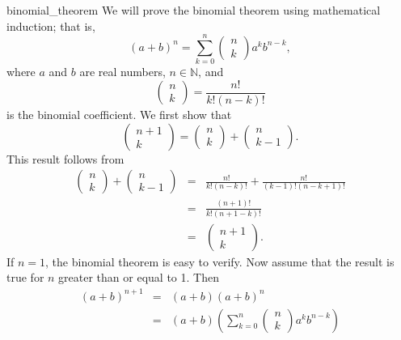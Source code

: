 \begin{example}{binomial_theorem}
We will prove the binomial theorem using mathematical induction; that is, 
$$
(a + b)^n = \sum_{k = 0}^{n} \left( \begin{array}{c} n \\ k \end{array} \right) a^k b^{n - k},
$$
where $a$ and $b$ are real numbers, $n \in \mathbb{N}$, and
$$
\left(
\begin{array}{c}
n \\ k
\end{array}
\right)\label{binomial}
= \frac{n!}{k! (n - k)!}\label{factorial}
$$
is the binomial coefficient.  We first show that
$$
\left( \begin{array}{c} n + 1 \\ k \end{array} \right)
=
\left( \begin{array}{c} n \\ k \end{array} \right)
+
\left( \begin{array}{c} n \\ k - 1  \end{array} \right).
$$
This result follows from
\begin{eqnarray*}
\left( \begin{array}{c} n \\ k \end{array} \right)
+
\left( \begin{array}{c} n \\ k - 1  \end{array} \right)
& = &
\frac{n!}{k!(n - k)!}
+\frac{n!}{(k-1)!(n - k + 1)!} \\
& = &
\frac{(n + 1)!}{k!(n + 1 - k)!} \\
& = &
\left( \begin{array}{c} n + 1 \\ k \end{array} \right).
\end{eqnarray*}
If $n = 1$, the binomial theorem is easy to verify. Now assume that the result is true for $n$ greater than or equal to 1.  Then
\begin{eqnarray*}
(a + b)^{n + 1}
&  = &
(a + b)(a + b)^n \\
& = &
(a + b) 
\left(
\sum_{k = 0}^{n} \left( \begin{array}{c} n \\ k \end{array} \right) a^k b^{n - k}
\right) \\

\end{eqnarray*}
\end{example}
